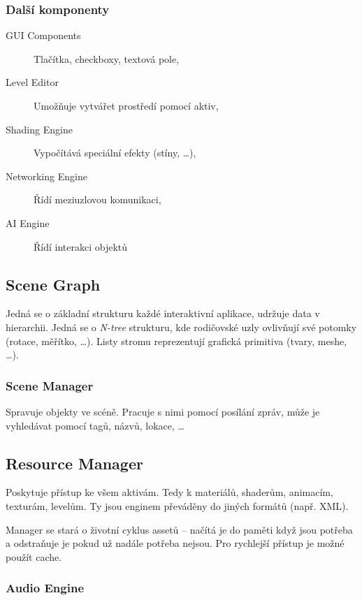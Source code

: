 \subsubsection*{Další komponenty}

\medskip

\begin{description}
    \item[GUI Components] Tlačítka, checkboxy, textová pole,
    \item[Level Editor] Umožňuje vytvářet prostředí pomocí aktiv,
    \item[Shading Engine] Vypočítává speciální efekty (stíny, \dots),
    \item[Networking Engine] Řídí meziuzlovou komunikaci,
    \item[AI Engine] Řídí interakci objektů 
\end{description}

\subsection*{Scene Graph}

Jedná se o základní strukturu každé interaktivní aplikace, udržuje data v hierarchii.
Jedná se o \textit{N-tree} strukturu, kde rodičovské uzly ovlivňují své potomky (rotace, měřítko, \dots).
Listy stromu reprezentují grafická primitiva (tvary, meshe, \dots).

\subsubsection*{Scene Manager}

Spravuje objekty ve scéně.
Pracuje s nimi pomocí posílání zpráv, může je vyhledávat pomocí tagů, názvů, lokace, \dots

\subsection*{Resource Manager}

Poskytuje přístup ke všem aktivám.
Tedy k materiálů, shaderům, animacím, texturám, levelům.
Ty jsou enginem převáděny do jiných formátů (např. XML).

Manager se stará o životní cyklus assetů -- načítá je do paměti když jsou potřeba a odstraňuje je pokud už nadále potřeba nejsou.
Pro rychlejší přístup je možné použít cache.

\subsubsection*{Audio Engine}

